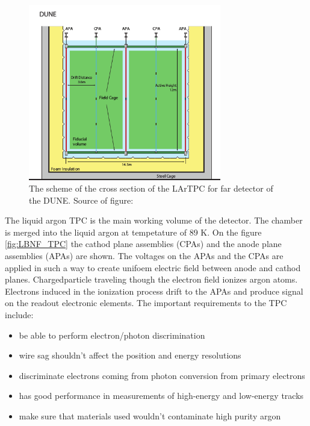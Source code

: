 \begin{figure}
\caption{The scheme of the cross section of the LArTPC for far detector of the DUNE. Source of figure: \cite{ref_LBNFdoc_volume-detectors}}
\label{fig:farDetector_TPC}
\centering
\includegraphics[width=0.75\textwidth, keepaspectratio=true]{figs/farDetector_TPC.png}
\end{figure}

The liquid argon TPC is the main working volume of the detector. The chamber is merged into the liquid argon at tempetature of 89 K. On the figure \ref{fig:LBNF_TPC} the cathod plane assemblies (CPAs) and the anode plane assemblies (APAs) are shown. The voltages on the APAs and the CPAs are applied in such a way to create unifoem electric field between anode and cathod planes. Chargedparticle traveling though the electron field ionizes argon atoms. Electrons induced in the ionization process drift to the APAs and produce signal on the readout electronic elements.
The important requirements to the TPC include:

\begin{itemize}
  \item be able to perform electron/photon discrimination
  \item wire sag shouldn't affect the position and energy resolutions
  \item discriminate electrons coming from photon conversion from primary electrons
  \item has good performance in measurements of high-energy and low-energy tracks
  \item make sure that materials used wouldn't contaminate high purity argon
\end{itemize}

